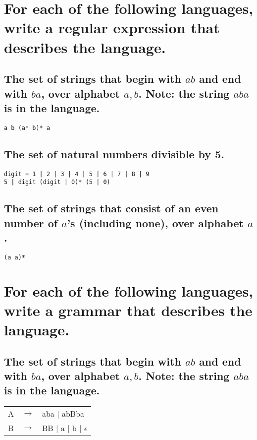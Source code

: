 \documentclass[letterpaper]{article}
\begin{document}
\section{For each of the following languages, write a regular expression that describes the language.}
\subsection{The set of strings that begin with $ab$ and end with $ba$, over alphabet ${a, b}$. Note: the string $aba$ is in the language.}
\begin{adjustwidth}{2.35em}{0pt}
\begin{verbatim}
a b (a* b)* a
\end{verbatim}
\end{adjustwidth}
\subsection{The set of natural numbers divisible by 5.}
\begin{adjustwidth}{2.35em}{0pt}
\begin{verbatim}
digit = 1 | 2 | 3 | 4 | 5 | 6 | 7 | 8 | 9
5 | digit (digit | 0)* (5 | 0)
\end{verbatim}
\end{adjustwidth}
\subsection{The set of strings that consist of an even number of $a$’s (including none), over alphabet ${a}$.}
\begin{adjustwidth}{2.35em}{0pt}
\begin{verbatim}
(a a)*
\end{verbatim}
\end{adjustwidth}

\section{For each of the following languages, write a grammar that describes the language.}
\subsection{The set of strings that begin with $ab$ and end with $ba$, over alphabet ${a, b}$. Note: the string $aba$ is in the language.}
\begin{adjustwidth}{2.35em}{0pt}
\begin{tabular}{l c l}
A & $\rightarrow$ & aba $|$ abBba \\
B & $\rightarrow$ & BB $|$ a $|$ b $|$ $\epsilon$
\end{tabular}
\end{adjustwidth}
\end{document}
